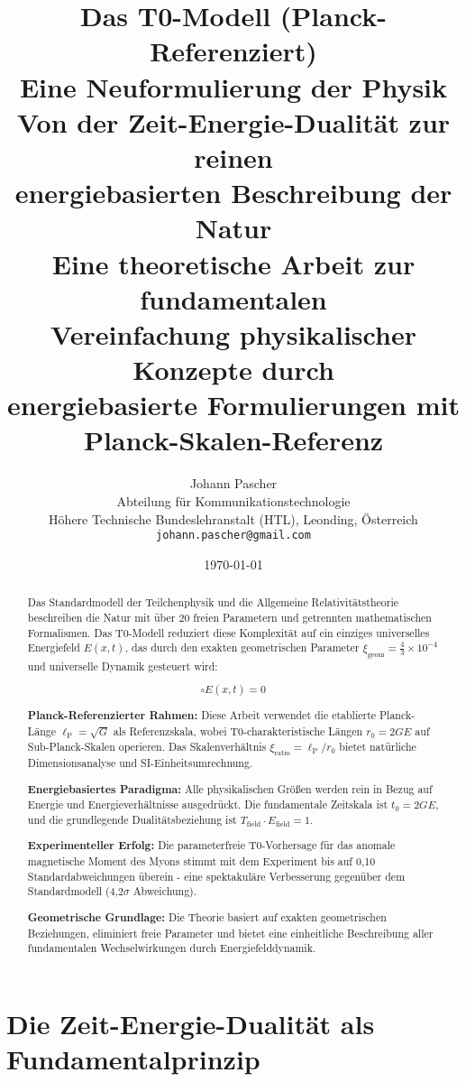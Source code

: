 \documentclass[12pt,a4paper]{report}
\title{
	{\Huge Das T0-Modell (Planck-Referenziert)}\\
	{\LARGE Eine Neuformulierung der Physik}\\
	{\Large Von der Zeit-Energie-Dualität zur reinen\\energiebasierten Beschreibung der Natur}\\
	\vspace{1cm}
	{\large Eine theoretische Arbeit zur fundamentalen\\Vereinfachung physikalischer Konzepte durch\\energiebasierte Formulierungen mit Planck-Skalen-Referenz}
}
\author{
	{\Large Johann Pascher}\\
	Abteilung für Kommunikationstechnologie\\
	Höhere Technische Bundeslehranstalt (HTL), Leonding, Österreich\\
	\texttt{johann.pascher@gmail.com}
}
\date{\today}
\newcommand{\Efield}{E(x,t)}              %
\newcommand{\lP}{\ell_{\text{P}}}         %
\newcommand{\rzero}{r_0}                  %
\newcommand{\tzero}{t_0}                  %
\newcommand{\xigeom}{\xi_{\text{geom}}}   %
\newcommand{\xirat}{\xi_{\text{ratio}}}   %
\begin{document}
	
	\maketitle
	
	\begin{abstract}
		Das Standardmodell der Teilchenphysik und die Allgemeine Relativitätstheorie beschreiben die Natur mit über 20 freien Parametern und getrennten mathematischen Formalismen. Das T0-Modell reduziert diese Komplexität auf ein einziges universelles Energiefeld $\Efield$, das durch den exakten geometrischen Parameter $\xigeom = \frac{4}{3} \times 10^{-4}$ und universelle Dynamik gesteuert wird:
		
		\begin{equation}
			\square \Efield = 0
		\end{equation}
		
		\textbf{Planck-Referenzierter Rahmen:} Diese Arbeit verwendet die etablierte Planck-Länge $\lP = \sqrt{G}$ als Referenzskala, wobei T0-charakteristische Längen $\rzero = 2GE$ auf Sub-Planck-Skalen operieren. Das Skalenverhältnis $\xirat = \lP/\rzero$ bietet natürliche Dimensionsanalyse und SI-Einheitsumrechnung.
		
		\textbf{Energiebasiertes Paradigma:} Alle physikalischen Größen werden rein in Bezug auf Energie und Energieverhältnisse ausgedrückt. Die fundamentale Zeitskala ist $\tzero = 2GE$, und die grundlegende Dualitätsbeziehung ist $T_{\text{field}} \cdot E_{\text{field}} = 1$.
		
		\textbf{Experimenteller Erfolg:} Die parameterfreie T0-Vorhersage für das anomale magnetische Moment des Myons stimmt mit dem Experiment bis auf 0,10 Standardabweichungen überein - eine spektakuläre Verbesserung gegenüber dem Standardmodell (4,2$\sigma$ Abweichung).
		
		\textbf{Geometrische Grundlage:} Die Theorie basiert auf exakten geometrischen Beziehungen, eliminiert freie Parameter und bietet eine einheitliche Beschreibung aller fundamentalen Wechselwirkungen durch Energiefelddynamik.
	\end{abstract}
	
	\tableofcontents
	
	\chapter{Die Zeit-Energie-Dualität als Fundamentalprinzip}\label{chap:time_energy_duality}
	
\end{document}
